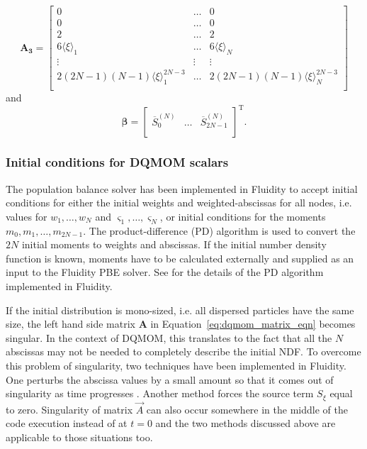 \begin{equation} \label{eq:A_3}
\mathbf{A_3} = 	\begin{bmatrix}
		0 & \dots & 0 \\
		0 & \dots & 0 \\
		2 & \dots & 2 \\
		6 \langle \xi \rangle_1 & \dots & 6 \langle \xi \rangle_N \\
		\vdots & \vdots & \vdots \\
		2(2N-1)(N-1) \langle \xi \rangle_1^{2N-3} & \dots & 2(2N-1)(N-1) \langle \xi \rangle_N^{2N-3} \\		
		\end{bmatrix}
\end{equation}
and 
\begin{equation} \label{eq:beta_vector}
\pmb{\beta} = 	\begin{bmatrix}
		\overline{S}_0^{(N)} & \dots & \overline{S}_{2N-1}^{(N)} \\	
		\end{bmatrix}^\mathrm{T}.
\end{equation}

\subsubsection{Initial conditions for DQMOM scalars} \label{sec:pbe_initial_conditions}
The population balance solver has been implemented in Fluidity to accept initial conditions for either the initial weights and weighted-abscissas for all nodes, i.e. values for $w_1, \dots, w_N$ and $\varsigma_1, \dots, \varsigma_N$, or initial conditions for the moments $m_0, m_1, \dots, m_{2N-1}$. The product-difference (PD) algorithm \citep{gordon1968error} is used to convert the $2N$ initial moments to weights and abscissas. If the initial number density function is known, moments have to be calculated externally and supplied as an input to the Fluidity PBE solver. See \cite{bhutani2016} for the details of the PD algorithm implemented in Fluidity. 

If the initial distribution is mono-sized, i.e. all dispersed particles have the same size, the left hand side matrix $\mathbf{A}$ in Equation~\eqref{eq:dqmom_matrix_eqn} becomes singular. In the context of DQMOM, this translates to the fact that all the $N$ abscissas may not be needed to completely describe the initial NDF. To overcome this problem of singularity, two techniques have been implemented in Fluidity. One perturbs the abscissa values by a small amount so that it comes out of singularity as time progresses \citep{marchisio2005solution}. Another method forces the source term $S_{\xi}$ equal to zero. Singularity of matrix $\vec{A}$ can also occur somewhere in the middle of the code execution instead of at $t=0$ and the two methods discussed above are applicable to those situations too. 

